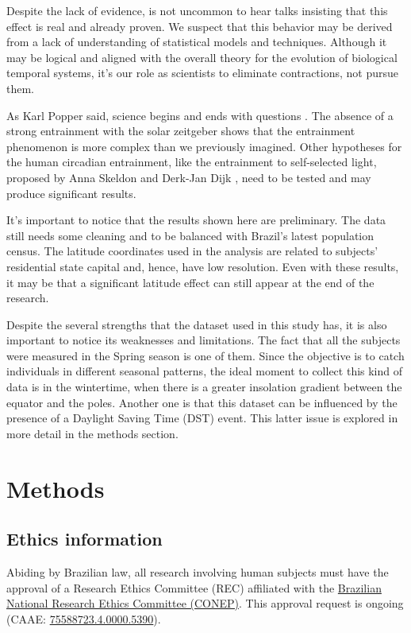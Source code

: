 \documentclass[
12pt,
openright,
oneside,
a4paper,
chapter=TITLE,
section=TITLE,
french,
spanish,
brazil,
english
]{abntex2}\usepackage{array}
\begin{document}
Despite the lack of evidence, is not uncommon to hear talks insisting
that this effect is real and already proven. We suspect that this
behavior may be derived from a lack of understanding of statistical
models and techniques. Although it may be logical and aligned with the
overall theory for the evolution of biological temporal systems, it's
our role as scientists to eliminate contractions, not pursue them.

As Karl Popper said, science begins and ends with questions
\autocite{popper1979}. The absence of a strong entrainment with the
solar zeitgeber shows that the entrainment phenomenon is more complex
than we previously imagined. Other hypotheses for the human circadian
entrainment, like the entrainment to self-selected light, proposed by
Anna Skeldon and Derk-Jan Dijk \autocite*{skeldon2021}, need to be
tested and may produce significant results.

It's important to notice that the results shown here are preliminary.
The data still needs some cleaning and to be balanced with Brazil's
latest population census. The latitude coordinates used in the analysis
are related to subjects' residential state capital and, hence, have low
resolution. Even with these results, it may be that a significant
latitude effect can still appear at the end of the research.

Despite the several strengths that the dataset used in this study has,
it is also important to notice its weaknesses and limitations. The fact
that all the subjects were measured in the Spring season is one of them.
Since the objective is to catch individuals in different seasonal
patterns, the ideal moment to collect this kind of data is in the
wintertime, when there is a greater insolation gradient between the
equator and the poles. Another one is that this dataset can be
influenced by the presence of a Daylight Saving Time (DST) event. This
latter issue is explored in more detail in the methods section.

\section{Methods}\label{methods}

\subsection{Ethics information}\label{ethics-information}

Abiding by Brazilian law, all research involving human subjects must
have the approval of a Research Ethics Committee (REC) affiliated with
the
\href{https://conselho.saude.gov.br/Web_comissoes/conep/index.html}{Brazilian
National Research Ethics Committee (CONEP)}. This approval request is
ongoing (CAAE:
\href{https://plataformabrasil.saude.gov.br/login.jsf}{75588723.4.0000.5390}).
\end{document}
